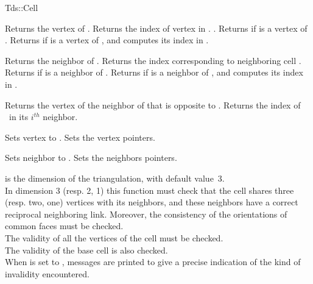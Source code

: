\begin{ccClass}{Tds::Cell}
\ccAccessFunctions

{Returns the vertex  of \ccVar.
}
\ccGlue
{}
{Returns the index of vertex  in \ccVar.
.}
\ccGlue
{}
{Returns  if   is a vertex of \ccVar.}
\ccGlue
{}
{Returns  if  is a vertex of \ccVar, and
computes its index  in \ccVar.}

{Returns  the neighbor  of \ccVar.
}
\ccGlue
{}
{Returns the index corresponding to neighboring cell .
}
\ccGlue
{}
{Returns  if  is a neighbor of \ccVar.}
\ccGlue
{}
{Returns  if  is a neighbor of \ccVar,  and
computes its index  in \ccVar.}

{Returns the vertex of the neighbor of \ccVar that is opposite to \ccVar.
}
{Returns the index of \ccVar\ in its $i^{th}$ neighbor.
}


{Sets vertex  to .
}
\ccGlue
{}
{Sets the vertex pointers.}

{Sets neighbor  to .
}
\ccGlue
{}
{Sets the neighbors pointers.}

{ is the dimension of the triangulation, with default
value~3.\\
In dimension 3 (resp. 2, 1) this function must check that the cell
shares three (resp. two, one) vertices with its neighbors, and these
neighbors have a correct reciprocal neighboring link. Moreover, the
consistency of the orientations of common faces must be checked.\\ 
The validity of all the vertices of the cell must be checked.\\
The validity of the base cell is also checked.\\ 
When  is set to , messages are printed to give
a precise indication of the kind of invalidity encountered.}

	\end{ccClass} 

